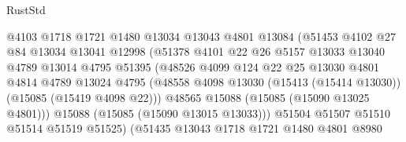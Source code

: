 \begin{lexlean}{RustStd}
\begin{coremodule}
                                @4103
                                @1718
                                @1721
                                @1480
                                @13034
                                @13043
                                @4801
                                @13084
                                (@51453
                                  @4102
                                  @27
                                  @84
                                  @13034
                                  @13041
                                  @12998
                                  (@51378
                                    @4101
                                    @22
                                    @26
                                    @5157
                                    @13033
                                    @13040
                                    @4789
                                    @13014
                                    @4795
                                    @51395
                                    (@48526
                                      @4099
                                      @124
                                      @22
                                      @25
                                      @13030
                                      @4801
                                      @4814
                                      @4789
                                      @13024
                                      @4795
                                      (@48558
                                        @4098
                                        @13030
                                        (@15413 (@15414 @13030))
                                        (@15085 (@15419 @4098 @22)))
                                      @48565
                                      @15088
                                      (@15085 (@15090 @13025 @4801)))
                                    @15088
                                    (@15085 (@15090 @13015 @13033)))
                                  @51504
                                  @51507
                                  @51510
                                  @51514
                                  @51519
                                  @51525)
                                (@51435
                                  @13043
                                  @1718
                                  @1721
                                  @1480
                                  @4801
                                  @8980

\end{coremodule}
\end{lexlean}
